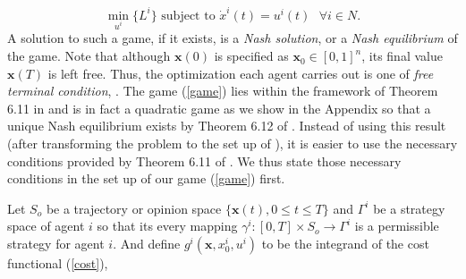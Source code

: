 \documentclass[10pt, conference, compsocconf]{IEEEtran}
\begin{document}
\begin{equation} \label{game}
	\min_{u^i} \lbrace L^i \rbrace \mbox{ subject to } \dot{x}^i(t) = u^i(t) \mbox{ \ \ \ } \forall i\in N. 
\end{equation}
A solution to such a game, if it exists, is a {\it Nash solution}, or a {\it Nash equilibrium} of the game.
Note that although $\mathbf{x}(0)$ is specified as $\mathbf{x}_0\in [0,1]^n$, its final value $\mathbf{x}(T)$ is left free. Thus, the optimization each agent carries out is one of {\it free terminal condition}, \cite{kirk}.   The game (\ref{game}) lies within the framework of Theorem 6.11 in \cite{basar} and is in fact a quadratic game as we show in the Appendix so that a unique Nash equilibrium exists by Theorem 6.12 of \cite{basar}. Instead of using this result (after transforming the problem to the set up of \cite{basar}), it is easier to use the necessary conditions provided by Theorem 6.11 of \cite{basar}. We thus state those necessary conditions in the set up of our game (\ref{game}) first.   

Let $S_o$ be a trajectory or opinion space $\lbrace \mathbf{x}(t), 0 \leq t \leq T \rbrace$ and $\Gamma^i$ be a strategy space of agent $i$ so that its every mapping $\gamma^i : [0,T]\times S_o \rightarrow \Gamma^i$ is a permissible strategy for agent $i$. And define $g^i(\mathbf{x},x_0^i,u^i)$ to be the integrand of the cost functional (\ref{cost}),
\end{document}
